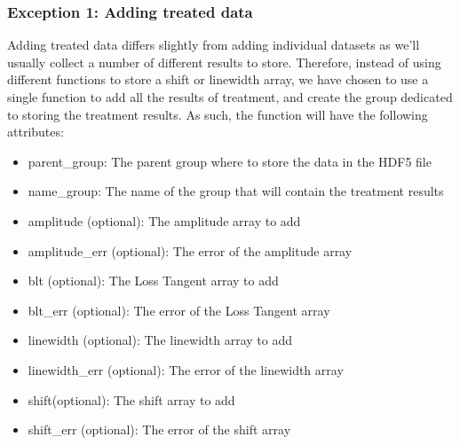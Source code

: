 \documentclass[letterpaper,10pt,english]{sphinxmanual}
\begin{document}
\subsubsection{Exception 1: Adding treated data}
\label{\detokenize{source/hdf5_bls_package:exception-1-adding-treated-data}}
\sphinxAtStartPar
Adding treated data differs slightly from adding individual datasets as we’ll usually collect a number of different results to store. Therefore, instead of using different functions to store a shift or linewidth array, we have chosen to use a single function to add all the results of treatment, and create the group dedicated to storing the treatment results. As such, the function will have the following attributes:
\begin{itemize}
\item {} 
\sphinxAtStartPar
parent\_group: The parent group where to store the data in the HDF5 file

\item {} 
\sphinxAtStartPar
name\_group: The name of the group that will contain the treatment results

\item {} 
\sphinxAtStartPar
amplitude (optional): The amplitude array to add

\item {} 
\sphinxAtStartPar
amplitude\_err (optional): The error of the amplitude array

\item {} 
\sphinxAtStartPar
blt (optional): The Loss Tangent array to add

\item {} 
\sphinxAtStartPar
blt\_err (optional): The error of the Loss Tangent array

\item {} 
\sphinxAtStartPar
linewidth (optional): The linewidth array to add

\item {} 
\sphinxAtStartPar
linewidth\_err (optional): The error of the linewidth array

\item {} 
\sphinxAtStartPar
shift(optional): The shift array to add

\item {} 
\sphinxAtStartPar
shift\_err (optional): The error of the shift array

\end{itemize}

\sphinxAtStartPar
{}
\end{document}
